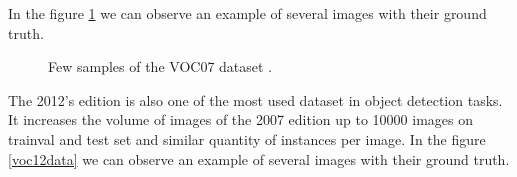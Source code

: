 In the figure \ref{voc07data} we can observe an example of several images with their ground truth.

\begin{figure}[H]
		
\centering
{}
\caption{Few samples of the VOC07 dataset .} \label{voc07data}

\end{figure}


The 2012's edition \cite{voc12website} is also one of the most used dataset in object detection tasks. It increases the volume of images of the 2007 edition up to 10000 images on trainval and test set and similar quantity of instances per image. In the figure \ref{voc12data} we can observe an example of several images with their ground truth.


